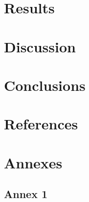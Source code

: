 \documentclass[12pt,twoside]{article}
\begin{document}
\section{Results}
\lipsum[1-10]
\clearpage
\section{Discussion}
\lipsum[1-10]
\clearpage
\section{Conclusions}
\lipsum[1-10]
\clearpage
\section{References}

\clearpage




\section{Annexes}
\subsection{Annex 1}
\end{document}

